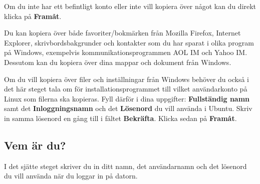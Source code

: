 \documentclass[a4paper,final]{memoir} %
\begin{document}

Om du inte har ett befintligt konto eller inte vill kopiera över något kan du direkt klicka på \textbf{Framåt}.

Du kan kopiera över både favoriter/bokmärken från Mozilla Firefox, Internet Explorer, skrivbordsbakgrunder och kontakter som du har sparat i olika program på Windows, exempelvis kommunikationsprogrammen AOL IM och Yahoo IM. Dessutom kan du  kopiera över dina mappar och dokument från Windows.

Om du vill kopiera över filer och inställningar från Windows behöver du också i det här steget tala om för installationsprogrammet till vilket användarkonto på Linux som filerna ska kopieras. Fyll därför i dina uppgifter: \textbf{Fullständig namn} samt det \textbf{Inloggningsnamn} och det \textbf{Lösenord} du vill använda i Ubuntu. Skriv in samma lösenord en gång till i fältet \textbf{Bekräfta}. Klicka sedan på \textbf{Framåt}.


\subsection{Vem är du?}

I det sjätte steget skriver du in ditt namn, det användarnamn och det lösenord du vill använda när du loggar in på datorn.


\end{document}
